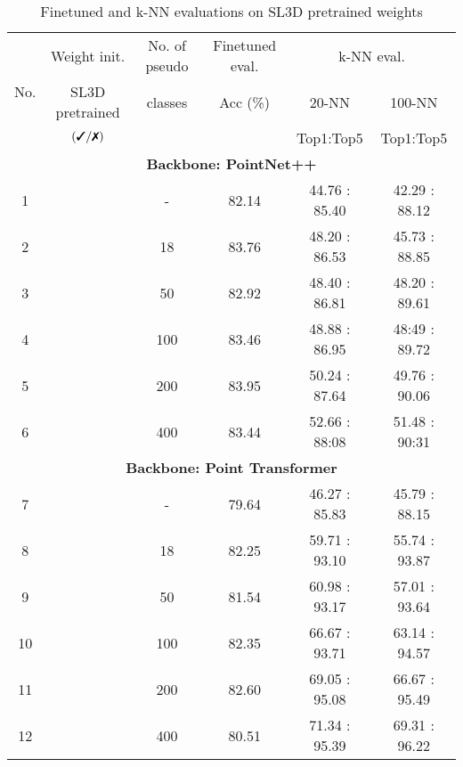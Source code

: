 \documentclass{article}
\newcommand{\cmark}{\text{\ding{51}}}\newcommand{\xmark}{\text{\ding{55}}}\newcommand{\xjqi}[1]{\textcolor{blue}{{[\textbf{xjqi}: #1]}}}
\begin{document}
\begin{table}[ht]
\caption{\label{Table:6} Finetuned and k-NN evaluations on SL3D pretrained weights}
\centering
\begin{tabular}{c c c c c | c} \toprule
    \multicolumn{1}{c}{\multirow{3}{*}{No.}}&\multicolumn{1}{c}{Weight init.}&\multicolumn{1}{c}{No. of pseudo }&\multicolumn{1}{c}{Finetuned eval.}&\multicolumn{2}{c}{k-NN eval.}\\
    \cmidrule(lr){4-4} \cmidrule(lr){5-6}
    \multicolumn{1}{c}{} & \multicolumn{1}{c}{SL3D pretrained} &{classes} & {Acc (\%)} & \multicolumn{1}{c}{20-NN} & \multicolumn{1}{c}{100-NN}\\ 
    \multicolumn{1}{c}{} & \multicolumn{1}{c}{$(\cmark / \xmark)$} & \multicolumn{2}{c}{} & \multicolumn{1}{c}{Top1:Top5} & \multicolumn{1}{c}{Top1:Top5}\\ \midrule
    \multicolumn{6}{S}{\textbf{Backbone: PointNet++ \cite{qi2017pointnetplusplus}}} \\ \midrule
    {1}  & {\xmark} & {-} & {82.14} & {44.76 : 85.40} & {42.29 : 88.12}\\
    {2}  & {\cmark} & {18} & {83.76}  & {48.20 : 86.53}  & {45.73 : 88.85}\\
    {3}  & {\cmark} & {50} & {82.92} & {48.40 : 86.81}  & {48.20 : 89.61}\\
    {4}  & {\cmark} & {100} & {83.46} & {48.88 : 86.95}  & {48:49 : 89.72}\\
    {5}  & {\cmark} & {200} & {83.95} & {50.24 : 87.64}  & {49.76 : 90.06}\\
    {6}  & {\cmark} & {400} & {83.44} & {52.66 : 88:08}  & {51.48 : 90:31}\\ \midrule
    \multicolumn{6}{S}{\textbf{Backbone: Point Transformer \cite{zhao2021point}}} \\ \midrule
    {7}  & {\xmark} & {-} & {79.64} & {46.27 : 85.83}  & {45.79 : 88.15}\\ 
    {8}  & {\cmark}  & {18} & {82.25} & {59.71 : 93.10} & {55.74 : 93.87}\\
    {9}  & {\cmark}  & {50} & {81.54} & {60.98 : 93.17}  & {57.01 : 93.64}\\
    {10}  & {\cmark}  & {100} & {82.35} & {66.67 : 93.71}  & {63.14 : 94.57}\\
    {11}  & {\cmark}  & {200} & {82.60} & {69.05 : 95.08}  & {66.67 : 95.49}\\
    {12}  & {\cmark}  & {400} & {80.51} & {71.34 : 95.39}  & {69.31 : 96.22}\\ \bottomrule

\end{tabular}
\end{table}
\end{document}
